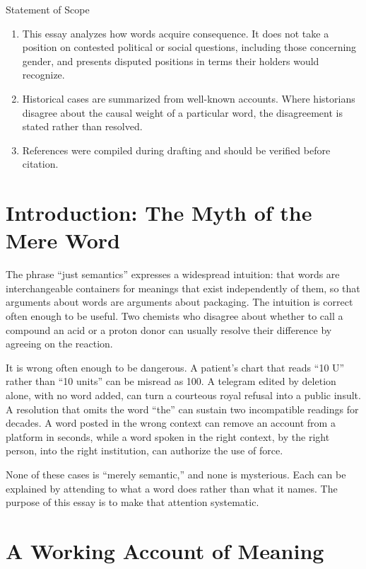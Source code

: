 \documentclass[11pt,a4paper]{article}
\theoremstyle{plain}
\theoremstyle{definition}
\theoremstyle{remark}
\begin{document}
\begin{statusbox}{Statement of Scope}
\small
\begin{enumerate}[leftmargin=1.4em,itemsep=2pt]
\item This essay analyzes how words acquire consequence. It does not take a position on contested political or social questions, including those concerning gender, and presents disputed positions in terms their holders would recognize.
\item Historical cases are summarized from well-known accounts. Where historians disagree about the causal weight of a particular word, the disagreement is stated rather than resolved.
\item References were compiled during drafting and should be verified before citation.
\end{enumerate}
\end{statusbox}

\section{Introduction: The Myth of the Mere Word}

The phrase ``just semantics'' expresses a widespread intuition: that words are interchangeable containers for meanings that exist independently of them, so that arguments about words are arguments about packaging. The intuition is correct often enough to be useful. Two chemists who disagree about whether to call a compound an acid or a proton donor can usually resolve their difference by agreeing on the reaction.

It is wrong often enough to be dangerous. A patient's chart that reads ``10 U'' rather than ``10 units'' can be misread as 100. A telegram edited by deletion alone, with no word added, can turn a courteous royal refusal into a public insult. A resolution that omits the word ``the'' can sustain two incompatible readings for decades. A word posted in the wrong context can remove an account from a platform in seconds, while a word spoken in the right context, by the right person, into the right institution, can authorize the use of force.

None of these cases is ``merely semantic,'' and none is mysterious. Each can be explained by attending to what a word does rather than what it names. The purpose of this essay is to make that attention systematic.

\section{A Working Account of Meaning}
\end{document}
